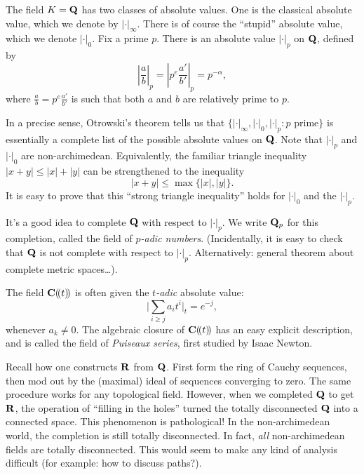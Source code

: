 \begin{example_}
The field $K=\mathbf{Q}$ has two classes of absolute values. One is the classical 
absolute value, which we denote by $|\cdot|_\infty$. There is of course the 
``stupid'' absolute value, which we denote $|\cdot|_0$. Fix a prime $p$. There 
is an absolute value $|\cdot|_p$ on $\mathbf{Q}$, defined by 
\[
  \left|\frac a b\right|_p = \left|p^e \frac{a'}{b'}\right|_p = p^{-\alpha} ,
\]
where $\frac a b=p^e \frac{a'}{b'}$ is such that both $a$ and $b$ are 
relatively prime to $p$. 
\end{example_}

In a precise sense, Otrowski's theorem tells us that 
$\{|\cdot|_\infty,|\cdot|_0,|\cdot|_p:\text{$p$ prime}\}$ is essentially a 
complete list of the possible absolute values on $\mathbf{Q}$. Note that 
$|\cdot|_p$ and $|\cdot|_0$ are non-archimedean. Equivalently, the familiar 
triangle inequality $|x+y|\leqslant |x|+|y|$ can be strengthened to the 
inequality 
\[
  |x+y| \leqslant \max\{|x|,|y|\} .
\]
It is easy to prove that this ``strong triangle inequality'' holds for 
$|\cdot|_0$ and the $|\cdot|_p$. 

It's a good idea to complete $\mathbf{Q}$ with respect to $|\cdot|_p$. We write 
$\mathbf{Q}_p$ for this completion, called the field of \emph{$p$-adic numbers}. 
(Incidentally, it is easy to check that $\mathbf{Q}$ is not complete with respect 
to $|\cdot|_p$. Alternatively: general theorem about complete metric spaces\ldots). 

\begin{example_}
The field $\mathbf{C}(\!( t)\!)$ is often given the \emph{$t$-adic} absolute 
value: 
\[
  \bigg|\sum_{i\geqslant j} a_i t^i\bigg|_t = e^{-j} ,
\]
whenever $a_k\ne 0$. The algebraic closure of $\mathbf{C}(\!( t)\!)$ has an easy 
explicit description, and is called the field of \emph{Puiseaux series}, first 
studied by Isaac Newton. 
\end{example_}

Recall how one constructs $\mathbf{R}$ from $\mathbf{Q}$. First form the ring of Cauchy 
sequences, then mod out by the (maximal) ideal of sequences converging to zero. 
The same procedure works for any topological field. However, when we completed 
$\mathbf{Q}$ to get $\mathbf{R}$, the operation of ``filling in the holes'' turned the 
totally disconnected $\mathbf{Q}$ into a connected space. This phenomenon is 
pathological! In the non-archimedean world, the completion is still totally 
disconnected. In fact, \emph{all} non-archimedean fields are totally 
disconnected. This would seem to make any kind of analysis difficult (for 
example: how to discuss paths?). 

